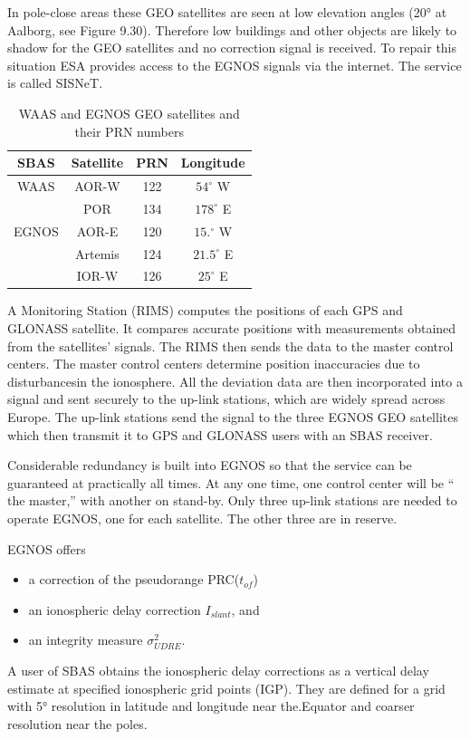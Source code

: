		In pole-close areas these GEO satellites are seen at low elevation angles (20° at Aalborg, see Figure 9.30). Therefore low buildings and other objects are likely to shadow for the GEO satellites and no correction signal is received. To repair this situation ESA provides access to the EGNOS signals via the internet. The service is called SISNeT.
		\begin{table}[h]
			\centering
			\caption{WAAS and EGNOS GEO satellites and their PRN numbers}
			\label{tab:9.8}
			\begin{tabular}{cccc}
				\hline
				SBAS & Satellite & PRN & Longitude \\ 
				\hline
				WAAS & AOR-W & 122 & $54^\circ$ W \\ 
					 & POR & 134 & $178^\circ$ E \\ 
				EGNOS & AOR-E & 120 & $15.^\circ$ W \\ 
					 & Artemis & 124 & $21.5^\circ$ E \\ 
					 & IOR-W & 126 & $25^\circ$ E \\
				\hline 
			\end{tabular} 
		\end{table}
		  
		A Monitoring Station (RIMS) computes the positions of each GPS and GLONASS satellite. It compares accurate positions with measurements obtained from the satellites’ signals. The RIMS then sends the data to the master control centers. The master control centers determine position inaccuracies due to disturbancesin the ionosphere. All the deviation data are then incorporated into a signal and sent securely to the up-link stations, which are widely spread across Europe. The up-link stations send the signal to the three EGNOS GEO satellites which then transmit it to GPS and GLONASS users with an SBAS receiver.
		
		Considerable redundancy is built into EGNOS so that the service can be guaranteed at practically all times. At any one time, one control center will be “ the master,” with another on stand-by. Only three up-link stations are needed to operate EGNOS, one for each satellite. The other three are in reserve.
		
		EGNOS offers
		\begin{itemize}
			\item a correction of the pseudorange PRC($t_{of}$)
			\item an ionospheric delay correction $I_{slant}$, and
			\item an integrity measure $\sigma^2_{UDRE}$.
		\end{itemize}
		A user of SBAS obtains the ionospheric delay corrections as a vertical delay estimate at specified ionospheric grid points (IGP). They are defined for a grid with 5° resolution in latitude and longitude near the.Equator and coarser resolution near the poles.
		
